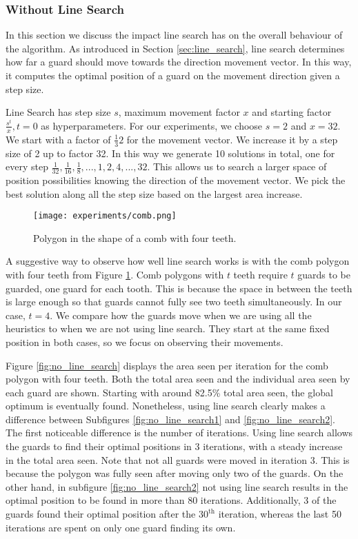 \subsubsection{Without Line Search}
In this section we  discuss the impact line search has on the overall behaviour of the algorithm. As introduced in Section \ref{sec:line_search}, line search determines how far a guard should move towards the direction movement vector. In this way, it computes the optimal position of a guard on the movement direction given a step size.

Line Search has step size $s$, maximum movement factor $x$ and starting factor $\frac{s^t}{x}, t = 0$ as hyperparameters. For our experiments, we choose $s = 2$ and $x = 32$. We start with a factor of $\frac 1 32$ for the movement vector. We  increase it by a step size of 2 up to factor 32.  In this way we generate 10 solutions in total, one for every step $\frac{1}{32}, \frac{1}{16}, \frac 1 8, ..., 1, 2, 4, ..., 32$. This  allows us to search a larger space of position possibilities knowing the direction of the movement vector. We  pick the best solution along all the step size based on the largest area increase. 

\begin{figure}[h!]
    \centering
    \texttt{[image: experiments/comb.png]}
    \caption{Polygon in the shape of a comb with four teeth.}
    \label{fig:comb}
\end{figure}

A suggestive way to observe how well line search works is with the comb polygon with four teeth from Figure \ref{fig:comb}. Comb polygons with $t$ teeth require $t$ guards to be guarded, one guard for each tooth. This is because the space in between the teeth is large enough so that guards cannot fully see two teeth simultaneously. In our case, $t = 4$. We  compare how the guards move when we are using all the heuristics to when we are not using line search. They  start at the same fixed position in both cases, so we  focus on observing their movements.


Figure \ref{fig:no_line_search} displays the area seen per iteration for the comb polygon with four teeth. Both the total area seen and the individual area seen by each guard are shown. Starting with around 82.5\% total area seen, the global optimum is eventually found. Nonetheless, using line search clearly makes a difference between Subfigures \ref{fig:no_line_search1} and \ref{fig:no_line_search2}. The first noticeable difference is the number of iterations. Using line search allows the guards to find their optimal positions in 3 iterations, with a steady increase in the total area seen. Note that not all guards were moved in iteration 3. This is because the polygon was fully seen after moving only two of the guards. On the other hand, in subfigure \ref{fig:no_line_search2} not using line search results in the optimal position to be found in more than 80 iterations. Additionally, 3 of the guards found their optimal position after the $30^{\text{th}}$ iteration, whereas the last 50 iterations are spent on only one guard finding its own.


